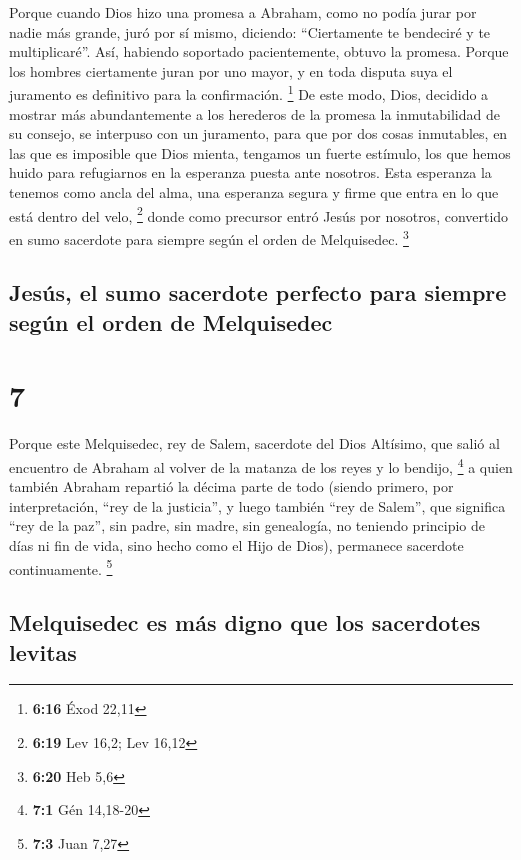  Porque cuando Dios hizo una promesa a Abraham, como no
podía jurar por nadie más grande, juró por sí mismo, 
diciendo: ``Ciertamente te bendeciré y te multiplicaré''.
 Así, habiendo soportado pacientemente, obtuvo la
promesa.  Porque los hombres ciertamente juran por uno
mayor, y en toda disputa suya el juramento es definitivo para la
confirmación. \footnote{\textbf{6:16} Éxod 22,11}  De
este modo, Dios, decidido a mostrar más abundantemente a los herederos
de la promesa la inmutabilidad de su consejo, se interpuso con un
juramento,  para que por dos cosas inmutables, en las que
es imposible que Dios mienta, tengamos un fuerte estímulo, los que hemos
huido para refugiarnos en la esperanza puesta ante nosotros.
 Esta esperanza la tenemos como ancla del alma, una
esperanza segura y firme que entra en lo que está dentro del velo,
\footnote{\textbf{6:19} Lev 16,2; Lev 16,12}  donde como
precursor entró Jesús por nosotros, convertido en sumo sacerdote para
siempre según el orden de Melquisedec. \footnote{\textbf{6:20} Heb 5,6}

\hypertarget{jesuxfas-el-sumo-sacerdote-perfecto-para-siempre-seguxfan-el-orden-de-melquisedec}{%
\subsection{Jesús, el sumo sacerdote perfecto para siempre según el
orden de
Melquisedec}\label{jesuxfas-el-sumo-sacerdote-perfecto-para-siempre-seguxfan-el-orden-de-melquisedec}}

\hypertarget{section-6}{%
\section{7}\label{section-6}}

 Porque este Melquisedec, rey de Salem, sacerdote del Dios
Altísimo, que salió al encuentro de Abraham al volver de la matanza de
los reyes y lo bendijo, \footnote{\textbf{7:1} Gén 14,18-20}
 a quien también Abraham repartió la décima parte de todo
(siendo primero, por interpretación, ``rey de la justicia'', y luego
también ``rey de Salem'', que significa ``rey de la paz'',
 sin padre, sin madre, sin genealogía, no teniendo
principio de días ni fin de vida, sino hecho como el Hijo de Dios),
permanece sacerdote continuamente. \footnote{\textbf{7:3} Juan 7,27}

\hypertarget{melquisedec-es-muxe1s-digno-que-los-sacerdotes-levitas}{%
\subsection{Melquisedec es más digno que los sacerdotes
levitas}\label{melquisedec-es-muxe1s-digno-que-los-sacerdotes-levitas}}

